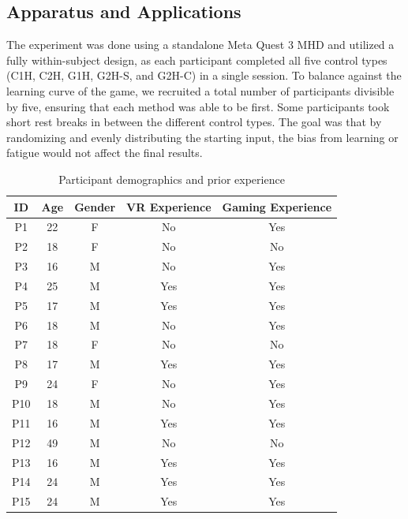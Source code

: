 \documentclass[acmlarge]{acmart}
\begin{document}
\subsection{Apparatus and Applications}
The experiment was done using a standalone Meta Quest 3 MHD and utilized a fully within-subject design, as each participant completed all five control types (C1H, C2H, G1H, G2H-S, and G2H-C) in a single session. To balance against the learning curve of the game, we recruited a total number of participants divisible by five, ensuring that each method was able to be first. Some participants took short rest breaks in between the different control types. The goal was that by randomizing and evenly distributing the starting input, the bias from learning or fatigue would not affect the final results.
\begin{table}[ht]
  \centering
  \small  %
  \caption{Participant demographics and prior experience}
  \label{tab:participants}
  \begin{tabular}{@{}ccccc@{}}
    \toprule
    \textbf{ID} & \textbf{Age} & \textbf{Gender} & \textbf{VR Experience} & \textbf{Gaming Experience} \\
    \midrule
    P1  & 22 & F & No  & Yes \\
    P2  & 18 & F & No  & No  \\
    P3  & 16 & M & No  & Yes \\
    P4  & 25 & M & Yes & Yes \\
    P5  & 17 & M & Yes & Yes \\
    P6  & 18 & M & No  & Yes \\
    P7  & 18 & F & No  & No  \\
    P8  & 17 & M & Yes & Yes \\
    P9  & 24 & F & No  & Yes \\
    P10 & 18 & M & No  & Yes \\
    P11 & 16 & M & Yes & Yes \\
    P12 & 49 & M & No  & No  \\
    P13 & 16 & M & Yes & Yes \\
    P14 & 24 & M & Yes & Yes \\
    P15 & 24 & M & Yes & Yes \\
    \bottomrule
  \end{tabular}
\end{table}
\end{document}
